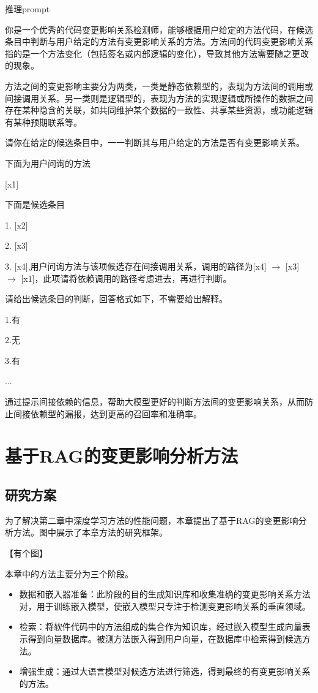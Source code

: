 \begin{promptbox}{推理prompt}

你是一个优秀的代码变更影响关系检测师，能够根据用户给定的方法代码，在候选条目中判断与用户给定的方法有变更影响关系的方法。方法间的代码变更影响关系指的是一个方法变化（包括签名或内部逻辑的变化），导致其他方法需要随之更改的现象。

方法之间的变更影响主要分为两类，一类是静态依赖型的，表现为方法间的调用或间接调用关系。另一类则是逻辑型的，表现为方法的实现逻辑或所操作的数据之间存在某种隐含的关联，如共同维护某个数据的一致性、共享某些资源，或功能逻辑有某种预期联系等。

请你在给定的候选条目中，一一判断其与用户给定的方法是否有变更影响关系。

下面为用户问询的方法

[x1]

下面是候选条目

1. [x2]

2. [x3]

3. [x4],用户问询方法与该项候选存在间接调用关系，调用的路径为[x4] $\rightarrow$ [x3] $\rightarrow$ [x1]，此项请将依赖调用的路径考虑进去，再进行判断。


请给出候选条目的判断，回答格式如下，不需要给出解释。

1.有 

2.无 

3.有

    ...
    
\end{promptbox}

通过提示间接依赖的信息，帮助大模型更好的判断方法间的变更影响关系，从而防止间接依赖型的漏报，达到更高的召回率和准确率。


\section{基于RAG的变更影响分析方法}

\subsection{研究方案}

为了解决第二章中深度学习方法的性能问题，本章提出了基于RAG的变更影响分析方法。图中展示了本章方法的研究框架。

【有个图】


本章中的方法主要分为三个阶段。

\begin{itemize}

    \item 数据和嵌入器准备：此阶段的目的生成知识库和收集准确的变更影响关系方法对，用于训练嵌入模型，使嵌入模型只专注于检测变更影响关系的垂直领域。

    \item 检索：将软件代码中的方法组成的集合作为知识库，经过嵌入模型生成向量表示得到向量数据库。被测方法嵌入得到用户向量，在数据库中检索得到候选方法。
    
    \item 增强生成：通过大语言模型对候选方法进行筛选，得到最终的有变更影响关系的方法。
    
\end{itemize}


